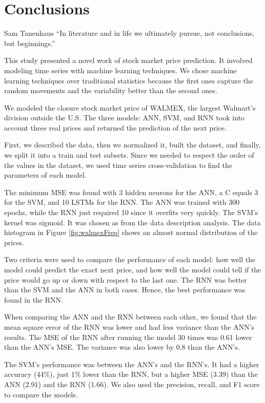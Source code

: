 \chapter{Conclusions}
\label{ch:conclusions}
\begin{chapterquote}{ Sam Tanenhaus}
“In literature and in life we ultimately pursue, not conclusions, but beginnings.”
\end{chapterquote}


This study presented a novel work of stock market price prediction. It involved modeling time series with machine learning techniques. We chose machine learning techniques over traditional statistics because the first ones capture the random movements and the variability better than the second ones. 


We modeled the closure stock market price of WALMEX, the largest Walmart's division outside the U.S. The three models: ANN, SVM, and RNN took into account three real prices and returned the prediction of the next price.

First, we described the data, then we normalized it, built the dataset, and finally, we split it into a train and test subsets. Since we needed to respect the order of the values in the dataset, we used time series cross-validation to find the parameters of each model.

The minimum MSE was found with 3 hidden neurons for the ANN, a C equals 3 for the SVM, and 10 LSTMs for the RNN. The ANN was trained with 300 epochs, while the RNN just required 10 since it overfits very quickly. The SVM's kernel was sigmoid. It was chosen as from the data description analysis. The data histogram in Figure \ref{fig:walmexFreq} shows an almost normal distribution of the prices. 

Two criteria were used to compare the performance of each model: how well the model could predict the exact next price, and how well the model could tell if the price would go up or down with respect to the last one. The RNN was better than the SVM and the ANN in both cases. Hence, the best performance was found in the RNN.

When comparing the ANN and the RNN between each other, we found that the mean square error of the RNN was lower and had less variance than the ANN's results. The MSE of the RNN after running the model 30 times was 0.61 lower than the ANN's MSE. The variance was also lower by 0.8 than the ANN's.

The SVM's performance was between the ANN's and the RNN's. It had a higher accuracy (44\%), just 1\% lower than the RNN, but a higher MSE (3.39) than the ANN (2.91) and the RNN (1.66). We also used the precision, recall, and F1 score to compare the models. 

